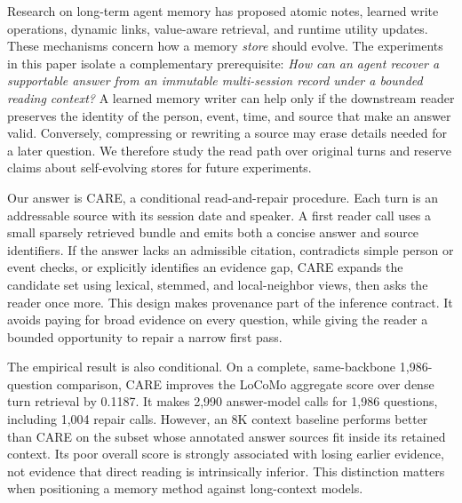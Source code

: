 \documentclass[11pt]{article}
\newcommand{\care}{\textsc{CARE}}
\begin{document}
Research on long-term agent memory has proposed atomic notes, learned write
operations, dynamic links, value-aware retrieval, and runtime utility
updates. These mechanisms concern how a memory \emph{store} should evolve.
The experiments in this paper isolate a complementary prerequisite:
\emph{How can an agent recover a supportable answer from an immutable
multi-session record under a bounded reading context?} A learned memory
writer can help only if the downstream reader preserves the identity of the
person, event, time, and source that make an answer valid. Conversely,
compressing or rewriting a source may erase details needed for a later
question. We therefore study the read path over original turns and reserve
claims about self-evolving stores for future experiments.

Our answer is \care{}, a conditional read-and-repair procedure. Each turn is
an addressable source with its session date and speaker. A first reader call
uses a small sparsely retrieved bundle and emits both a concise answer and
source identifiers. If the answer lacks an admissible citation, contradicts
simple person or event checks, or explicitly identifies an evidence gap,
\care{} expands the candidate set using lexical, stemmed, and local-neighbor
views, then asks the reader once more. This design makes provenance part of
the inference contract. It avoids paying for broad evidence on every
question, while giving the reader a bounded opportunity to repair a narrow
first pass.

The empirical result is also conditional. On a complete, same-backbone
1,986-question comparison, \care{} improves the LoCoMo aggregate score over
dense turn retrieval by 0.1187. It makes 2,990 answer-model calls for 1,986
questions, including 1,004 repair calls. However, an 8K context baseline
performs better than \care{} on the subset whose annotated answer sources
fit inside its retained context. Its poor overall score is strongly
associated with losing earlier evidence, not evidence that direct reading
is intrinsically inferior. This distinction matters when positioning a
memory method against long-context models.
\end{document}
